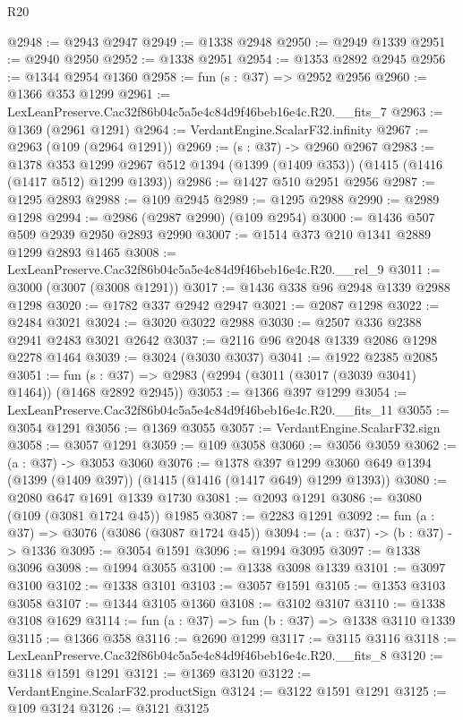\begin{lexlean}{R20}
\begin{coremodule}
@2948 := @2943 @2947
@2949 := @1338 @2948
@2950 := @2949 @1339
@2951 := @2940 @2950
@2952 := @1338 @2951
@2954 := @1353 @2892 @2945
@2956 := @1344 @2954 @1360
@2958 := fun (s : @37) => @2952 @2956
@2960 := @1366 @353 @1299
@2961 := LexLeanPreserve.Cac32f86b04c5a5e4c84d9f46beb16e4c.R20.__fits_7
@2963 := @1369 (@2961 @1291)
@2964 := VerdantEngine.ScalarF32.infinity
@2967 := @2963 (@109 (@2964 @1291))
@2969 := (s : @37) -> @2960 @2967
@2983 := @1378
    @353
    @1299
    @2967
    @512
    @1394
    (@1399 (@1409 @353))
    (@1415 (@1416 (@1417 @512) @1299 @1393))
@2986 := @1427 @510 @2951 @2956
@2987 := @1295 @2893
@2988 := @109 @2945
@2989 := @1295 @2988
@2990 := @2989 @1298
@2994 := @2986 (@2987 @2990) (@109 @2954)
@3000 := @1436 @507 @509 @2939 @2950 @2893 @2990
@3007 := @1514 @373 @210 @1341 @2889 @1299 @2893 @1465
@3008 := LexLeanPreserve.Cac32f86b04c5a5e4c84d9f46beb16e4c.R20.__rel_9
@3011 := @3000 (@3007 (@3008 @1291))
@3017 := @1436 @338 @96 @2948 @1339 @2988 @1298
@3020 := @1782 @337 @2942 @2947
@3021 := @2087 @1298
@3022 := @2484 @3021
@3024 := @3020 @3022 @2988
@3030 := @2507 @336 @2388 @2941 @2483 @3021 @2642
@3037 := @2116 @96 @2048 @1339 @2086 @1298 @2278 @1464
@3039 := @3024 (@3030 @3037)
@3041 := @1922 @2385 @2085
@3051 := fun (s : @37) => @2983 (@2994 (@3011 (@3017 (@3039 @3041) @1464)) (@1468 @2892 @2945))
@3053 := @1366 @397 @1299
@3054 := LexLeanPreserve.Cac32f86b04c5a5e4c84d9f46beb16e4c.R20.__fits_11
@3055 := @3054 @1291
@3056 := @1369 @3055
@3057 := VerdantEngine.ScalarF32.sign
@3058 := @3057 @1291
@3059 := @109 @3058
@3060 := @3056 @3059
@3062 := (a : @37) -> @3053 @3060
@3076 := @1378
    @397
    @1299
    @3060
    @649
    @1394
    (@1399 (@1409 @397))
    (@1415 (@1416 (@1417 @649) @1299 @1393))
@3080 := @2080 @647 @1691 @1339 @1730
@3081 := @2093 @1291
@3086 := @3080 (@109 (@3081 @1724 @45)) @1985
@3087 := @2283 @1291
@3092 := fun (a : @37) => @3076 (@3086 (@3087 @1724 @45))
@3094 := (a : @37) -> (b : @37) -> @1336
@3095 := @3054 @1591
@3096 := @1994 @3095
@3097 := @1338 @3096
@3098 := @1994 @3055
@3100 := @1338 @3098 @1339
@3101 := @3097 @3100
@3102 := @1338 @3101
@3103 := @3057 @1591
@3105 := @1353 @3103 @3058
@3107 := @1344 @3105 @1360
@3108 := @3102 @3107
@3110 := @1338 @3108 @1629
@3114 := fun (a : @37) => fun (b : @37) => @1338 @3110 @1339
@3115 := @1366 @358
@3116 := @2690 @1299
@3117 := @3115 @3116
@3118 := LexLeanPreserve.Cac32f86b04c5a5e4c84d9f46beb16e4c.R20.__fits_8
@3120 := @3118 @1591 @1291
@3121 := @1369 @3120
@3122 := VerdantEngine.ScalarF32.productSign
@3124 := @3122 @1591 @1291
@3125 := @109 @3124
@3126 := @3121 @3125

\end{coremodule}
\end{lexlean}
